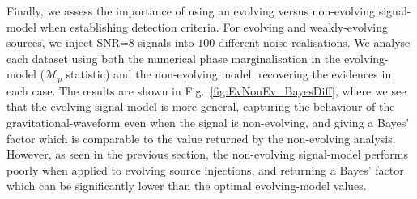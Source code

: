 \documentclass[prd,showpacs,nofootinbib]{revtex4}
\newcommand{\incgraph}[3]{\texttt{[image: \#3]}}
\begin{document}


Finally, we assess the importance of using an evolving versus non-evolving signal-model when establishing detection criteria. For evolving and weakly-evolving sources, we inject SNR=8 signals into $100$ different noise-realisations. We analyse each dataset using both the numerical phase marginalisation in the evolving-model ($\mathcal{M}_p$ statistic) and the non-evolving model, recovering the evidences in each case. The results are shown in Fig.\ \ref{fig:EvNonEv_BayesDiff}, where we see that the evolving signal-model is more general, capturing the behaviour of the gravitational-waveform even when the signal is non-evolving, and giving a Bayes' factor which is comparable to the value returned by the non-evolving analysis. However, as seen in the previous section, the non-evolving signal-model performs poorly when applied to evolving source injections, and returning a Bayes' factor which can be significantly lower than the optimal evolving-model values.
\end{document}
